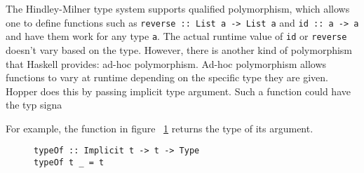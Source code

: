 The Hindley-Milner type system supports qualified polymorphism, which allows one to define functions such as \texttt{reverse :: List a -> List a} and \texttt{id :: a -> a} and have them work for any type \texttt{a}. The actual runtime value of \texttt{id} or \texttt{reverse} doesn't vary based on the type. However, there is another kind of polymorphism that Haskell provides: ad-hoc polymorphism. 
Ad-hoc polymorphism allows functions to vary at runtime depending on the specific type they are given. Hopper does this by passing implicit type argument. Such a function could have the typ signa


For example, the function in figure ~\ref{lst:tc_implicit} returns the type of its argument.

\begin{figure}[!htb]
\centering
\begin{minipage}[b]{0.55\linewidth}
\centering
\begin{lstlisting}
typeOf :: Implicit t -> t -> Type
typeOf t _ = t
\end{lstlisting}
\end{minipage}
\caption{}
\label{lst:tc_implicit}
\end{figure}






